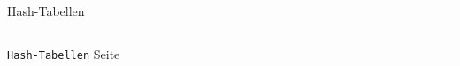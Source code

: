\documentclass{slides}
\newcounter{mypage}
\begin{document}


\begin{slide}{}
\normalsize

\begin{center}
Hash-Tabellen
\end{center}
\vspace*{0.5cm}

\footnotesize


\vspace*{\fill}
\tiny \addtocounter{mypage}{1}
\rule{17cm}{1mm}
\texttt{Hash-Tabellen} \hspace*{\fill} Seite 
\end{slide}


\end{document}
